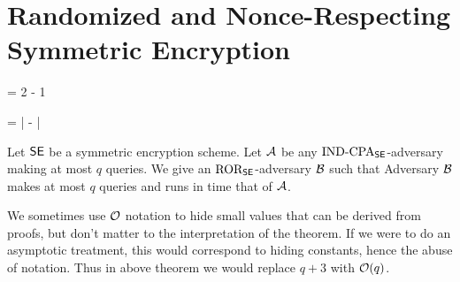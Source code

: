 \section{Randomized and Nonce-Respecting Symmetric Encryption}
\label{sec:freqanalysis}




\bnm
\AdvINDCPA{\SE}{\advA} = 2\cdotsm\Prob{\INDCPA_\SE^\advA\Rightarrow\true} - 1
\enm

\bnm
\AdvINDCPA{\SE}{\advA} = 
    \left| -  \right| 
\enm


\begin{theorem}
Let ${\mathsf{SE}}$ be a symmetric encryption scheme. Let ${\mathcal A}$ be any
$\textnormal{IND-CPA}_{\mathsf{SE}}$-adversary making at most $q$ queries. 
We give an $\textnormal{ROR}_{\mathsf{SE}}$-adversary ${\mathcal B}$ such that
\bnm
  \AdvINDCPA{\SE}{\advA} \cdotsm\AdvROR{\SE}{\advB}
\enm
Adversary ${\mathcal B}$ makes at most $q$ 
queries and runs in time that of ${\mathcal A}$.
\end{theorem}

We sometimes use ${\cal O}$ notation to hide small values that can be derived from
proofs, but don't matter to the interpretation of the theorem. If we were to do
an asymptotic treatment, this would correspond to hiding constants, hence the
abuse of notation.  Thus in above theorem we would replace $q+3$ with
${\cal O}(q)$. 



